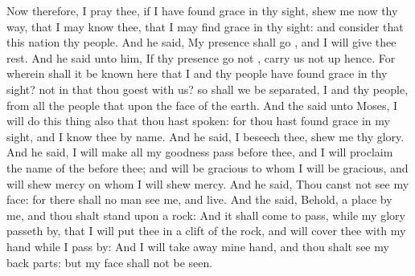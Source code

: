 {Now therefore, I pray thee, if I have
found
grace in thy
sight,
shew me now thy
way, that I may
know thee, that I may
find
grace in thy
sight: and
consider that this
nation
{} thy
people.
And he
said, My
presence shall
go
{}, and I will give thee
rest.
And he
said unto him, If thy
presence
go not
{}, carry us not
up hence.
For wherein shall it be
known
here that I and thy
people have
found
grace in thy
sight?
{} not in that thou
goest with us? so shall we be
separated, I and thy
people, from all the
people that
{} upon the
face of the
earth.
And the
{}
said unto
Moses, I will
do this
thing also that thou hast
spoken: for thou hast
found
grace in my
sight, and I
know thee by
name.
And he
said, I beseech
thee,
shew me thy
glory.
And he
said, I will make all my
goodness
pass before thee, and I will
proclaim the
name of the
{}
before thee; and will be
gracious to whom I will be
gracious, and will shew
mercy on whom I will shew
mercy.
And he
said, Thou
canst not
see my
face: for there shall no
man
see me, and
live.
And the
{}
said, Behold,
{} a
place by me, and thou shalt
stand upon a
rock:
And it shall come to pass, while my
glory passeth
by, that I will
put thee in a
clift of the
rock, and will
cover thee with my
hand
while I pass
by:
And I will
take away mine
hand, and thou shalt
see my back
parts: but my
face shall not be
seen.

}
